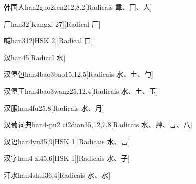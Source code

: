\begin{entry}{韩国人}{han2guo2ren2}{12,8,2}[Radicais ⾱、⼞、⼈]
\end{entry}

\begin{entry}{厂}{han3}{2}[Kangxi 27][Radical ⼚]
\end{entry}

\begin{entry}{喊}{han3}{12}[HSK 2][Radical ⼝]
\end{entry}

\begin{entry}{汉}{han4}{5}[Radical ⽔]
\end{entry}

\begin{entry}{汉堡包}{han4bao3bao1}{5,12,5}[Radicais ⽔、⼟、⼓]
\end{entry}

\begin{entry}{汉堡王}{han4bao3wang2}{5,12,4}[Radicais ⽔、⼟、⽟]
\end{entry}

\begin{entry}{汉服}{han4fu2}{5,8}[Radicais ⽔、⽉]
\end{entry}

\begin{entry}{汉葡词典}{han4-pu2 ci2dian3}{5,12,7,8}[Radicais ⽔、⾋、⾔、⼋]
\end{entry}

\begin{entry}{汉语}{han4yu3}{5,9}[HSK 1][Radicais ⽔、⾔]
\end{entry}

\begin{entry}{汉字}{han4 zi4}{5,6}[HSK 1][Radicais ⽔、⼦]
\end{entry}

\begin{entry}{汗水}{han4shui3}{6,4}[Radicais ⽔、⽔]
\end{entry}

